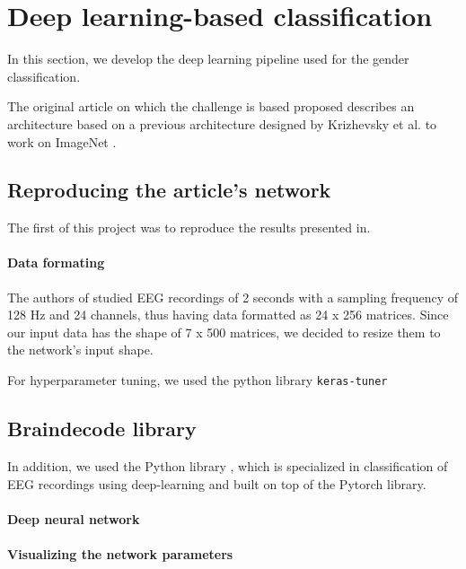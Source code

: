 \section{Deep learning-based classification}

In this section, we develop the deep learning pipeline used for the gender classification. 

The original article on which the challenge is based proposed \cite{vanPutten2018} describes an architecture based on a previous architecture designed by Krizhevsky et al. to work on ImageNet \cite{Krizhevsky2012}. 


\subsection{Reproducing the article's network}

The first of this project was to reproduce the results presented in\cite{vanPutten2018}. 

\paragraph{Data formating} The authors of\cite{vanPutten2018} studied EEG recordings of 2 seconds with a sampling frequency of 128 Hz and 24 channels, thus having data formatted as 24 x 256 matrices. Since our input data has the shape of 7 x 500 matrices, we decided to resize them to the network's input shape.

For hyperparameter tuning, we used the python library \texttt{keras-tuner}

\subsection{Braindecode library}

In addition, we used the Python library \cite{braindecode}, which is specialized in classification of EEG recordings using deep-learning and built on top of the Pytorch library.

\paragraph{Deep neural network}

\paragraph{Visualizing the network parameters}
